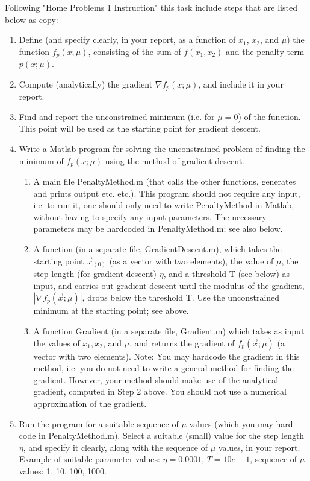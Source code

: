 \documentclass[main.tex]{subfiles}
\begin{document}
Following "Home Problems 1 Instruction" this task include steps that are listed below as copy:

\begin{enumerate}
    \item Define (and specify clearly, in your report, as a function of $x_1$, $x_2$, and $\mu$) the function $f_p(x;\mu)$, consisting of the sum of $f(x_1,x_2)$ and the penalty term $p(x;\mu)$.
    \item Compute (analytically) the gradient $\nabla{f_p(x;\mu)}$, and include it in your report.
    \item Find and report the unconstrained minimum (i.e. for $\mu = 0$) of the function. This point will be used as the starting point for gradient descent.
    \item Write a Matlab program for solving the unconstrained problem of ﬁnding the minimum of $f_p(x;\mu)$ using the method of gradient descent. 
    \begin{enumerate}
        \item A main file PenaltyMethod.m (that calls the other functions, generates and prints output etc. etc.). This program should not require any input, i.e. to run it, one should only need to write PenaltyMethod in Matlab, without having to specify any input parameters. The necessary parameters may be hardcoded in PenaltyMethod.m; see also below. 
        \item A function (in a separate file, GradientDescent.m), which takes the starting point $\vec{x}_{(0)}$ (as a vector with two elements), the value of $\mu$, the step length (for gradient descent) $\eta$, and a threshold T (see below) as input, and carries out gradient descent until the modulus of the gradient, $|\nabla{f_p(\vec{x};\mu)}|$, drops below the threshold T. Use the unconstrained minimum at the starting point; see above. 
        \item A function Gradient (in a separate ﬁle, Gradient.m) which takes as input the values of $x_1, x_2$, and $\mu$, and returns the gradient of $f_p(\vec{x};\mu)$ (a vector with two elements). Note: You may hardcode the gradient in this method, i.e. you do not need to write a general method for ﬁnding the gradient. However, your method should make use of the analytical gradient, computed in Step 2 above. You should not use a numerical approximation of the gradient.
    \end{enumerate}
    \item Run the program for a suitable sequence of $\mu$ values (which you may hard-code in PenaltyMethod.m). Select a suitable (small) value for the step length $\eta$, and specify it clearly, along with the sequence of $\mu$ values, in your report. Example of suitable parameter values: $\eta = 0.0001$, $T = 10e-1$, sequence of $\mu$ values: 1, 10, 100, 1000.
    
\end{enumerate}
\end{document}
